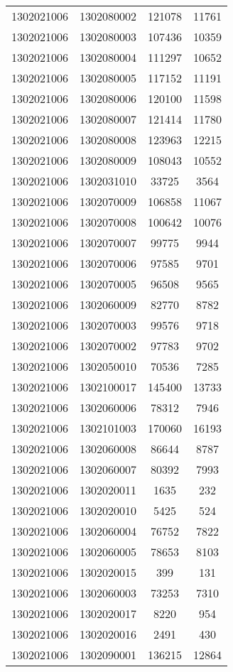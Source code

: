 \begin{longtable}[h]{llcc}
		1302021006 & 1302080002 & 121078 & 11761\\
		1302021006 & 1302080003 & 107436 & 10359\\
		1302021006 & 1302080004 & 111297 & 10652\\
		1302021006 & 1302080005 & 117152 & 11191\\
		1302021006 & 1302080006 & 120100 & 11598\\
		1302021006 & 1302080007 & 121414 & 11780\\
		1302021006 & 1302080008 & 123963 & 12215\\
		1302021006 & 1302080009 & 108043 & 10552\\
		1302021006 & 1302031010 & 33725 & 3564\\
		1302021006 & 1302070009 & 106858 & 11067\\
		1302021006 & 1302070008 & 100642 & 10076\\
		1302021006 & 1302070007 & 99775 & 9944\\
		1302021006 & 1302070006 & 97585 & 9701\\
		1302021006 & 1302070005 & 96508 & 9565\\
		1302021006 & 1302060009 & 82770 & 8782\\
		1302021006 & 1302070003 & 99576 & 9718\\
		1302021006 & 1302070002 & 97783 & 9702\\
		1302021006 & 1302050010 & 70536 & 7285\\
		1302021006 & 1302100017 & 145400 & 13733\\
		1302021006 & 1302060006 & 78312 & 7946\\
		1302021006 & 1302101003 & 170060 & 16193\\
		1302021006 & 1302060008 & 86644 & 8787\\
		1302021006 & 1302060007 & 80392 & 7993\\
		1302021006 & 1302020011 & 1635 & 232\\
		1302021006 & 1302020010 & 5425 & 524\\
		1302021006 & 1302060004 & 76752 & 7822\\
		1302021006 & 1302060005 & 78653 & 8103\\
		1302021006 & 1302020015 & 399 & 131\\
		1302021006 & 1302060003 & 73253 & 7310\\
		1302021006 & 1302020017 & 8220 & 954\\
		1302021006 & 1302020016 & 2491 & 430\\
		1302021006 & 1302090001 & 136215 & 12864\\

\end{longtable}
